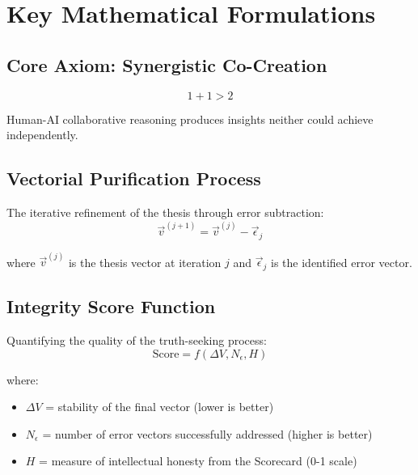 \documentclass[11pt,a4paper]{article}
\begin{document}
\vspace{1cm}

\section*{Key Mathematical Formulations}

\subsection*{Core Axiom: Synergistic Co-Creation}
\begin{equation}
1 + 1 > 2
\label{eq:synergy}
\end{equation}

\noindent Human-AI collaborative reasoning produces insights neither could achieve independently.

\subsection*{Vectorial Purification Process}
The iterative refinement of the thesis through error subtraction:
\begin{equation}
\vec{v}^{(j+1)} = \vec{v}^{(j)} - \vec{\epsilon}_j
\label{eq:purification}
\end{equation}

where $\vec{v}^{(j)}$ is the thesis vector at iteration $j$ and $\vec{\epsilon}_j$ is the identified error vector.

\subsection*{Integrity Score Function}
Quantifying the quality of the truth-seeking process:
\begin{equation}
\text{Score} = f(\Delta V, N_{\epsilon}, H)
\label{eq:integrity}
\end{equation}

where:
\begin{itemize}[nosep]
    \item $\Delta V$ = stability of the final vector (lower is better)
    \item $N_{\epsilon}$ = number of error vectors successfully addressed (higher is better)
    \item $H$ = measure of intellectual honesty from the Scorecard (0-1 scale)
\end{itemize}
\end{document}

